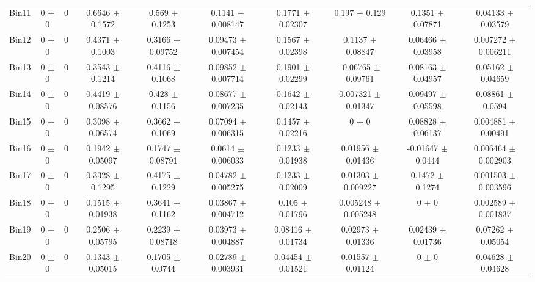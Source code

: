 \begin{tabular}{@{\extracolsep{4pt}}lccccccccc@{}}
     Bin11 & 0 $\pm$ 0 & 0 & 0.6646 $\pm$ 0.1572 & 0.569 $\pm$ 0.1253 & 0.1141 $\pm$ 0.008147 & 0.1771 $\pm$ 0.02307 & 0.197 $\pm$ 0.129 & 0.1351 $\pm$ 0.07871 & 0.04133 $\pm$ 0.03579 \\ 
     Bin12 & 0 $\pm$ 0 & 0 & 0.4371 $\pm$ 0.1003 & 0.3166 $\pm$ 0.09752 & 0.09473 $\pm$ 0.007454 & 0.1567 $\pm$ 0.02398 & 0.1137 $\pm$ 0.08847 & 0.06466 $\pm$ 0.03958 & 0.007272 $\pm$ 0.006211 \\ 
     Bin13 & 0 $\pm$ 0 & 0 & 0.3543 $\pm$ 0.1214 & 0.4116 $\pm$ 0.1068 & 0.09852 $\pm$ 0.007714 & 0.1901 $\pm$ 0.02299 & -0.06765 $\pm$ 0.09761 & 0.08163 $\pm$ 0.04957 & 0.05162 $\pm$ 0.04659 \\ 
     Bin14 & 0 $\pm$ 0 & 0 & 0.4419 $\pm$ 0.08576 & 0.428 $\pm$ 0.1156 & 0.08677 $\pm$ 0.007235 & 0.1642 $\pm$ 0.02143 & 0.007321 $\pm$ 0.01347 & 0.09497 $\pm$ 0.05598 & 0.08861 $\pm$ 0.0594 \\ 
     Bin15 & 0 $\pm$ 0 & 0 & 0.3098 $\pm$ 0.06574 & 0.3662 $\pm$ 0.1069 & 0.07094 $\pm$ 0.006315 & 0.1457 $\pm$ 0.02216 & 0 $\pm$ 0 & 0.08828 $\pm$ 0.06137 & 0.004881 $\pm$ 0.00491 \\ 
     Bin16 & 0 $\pm$ 0 & 0 & 0.1942 $\pm$ 0.05097 & 0.1747 $\pm$ 0.08791 & 0.0614 $\pm$ 0.006033 & 0.1233 $\pm$ 0.01938 & 0.01956 $\pm$ 0.01436 & -0.01647 $\pm$ 0.0444 & 0.006464 $\pm$ 0.002903 \\ 
     Bin17 & 0 $\pm$ 0 & 0 & 0.3328 $\pm$ 0.1295 & 0.4175 $\pm$ 0.1229 & 0.04782 $\pm$ 0.005275 & 0.1233 $\pm$ 0.02009 & 0.01303 $\pm$ 0.009227 & 0.1472 $\pm$ 0.1274 & 0.001503 $\pm$ 0.003596 \\ 
     Bin18 & 0 $\pm$ 0 & 0 & 0.1515 $\pm$ 0.01938 & 0.3641 $\pm$ 0.1162 & 0.03867 $\pm$ 0.004712 & 0.105 $\pm$ 0.01796 & 0.005248 $\pm$ 0.005248 & 0 $\pm$ 0 & 0.002589 $\pm$ 0.001837 \\ 
     Bin19 & 0 $\pm$ 0 & 0 & 0.2506 $\pm$ 0.05795 & 0.2239 $\pm$ 0.08718 & 0.03973 $\pm$ 0.004887 & 0.08416 $\pm$ 0.01734 & 0.02973 $\pm$ 0.01336 & 0.02439 $\pm$ 0.01736 & 0.07262 $\pm$ 0.05054 \\ 
     Bin20 & 0 $\pm$ 0 & 0 & 0.1343 $\pm$ 0.05015 & 0.1705 $\pm$ 0.0744 & 0.02789 $\pm$ 0.003931 & 0.04454 $\pm$ 0.01521 & 0.01557 $\pm$ 0.01124 & 0 $\pm$ 0 & 0.04628 $\pm$ 0.04628 \\ 
\hline\hline
  \end{tabular}
